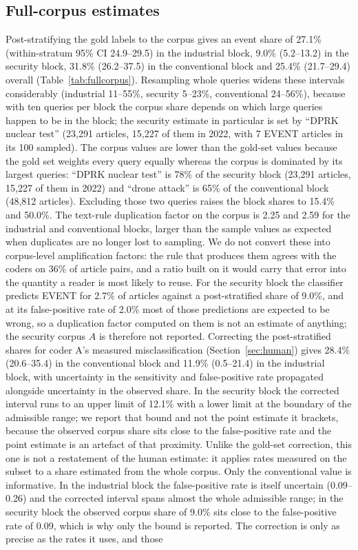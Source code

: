 \documentclass[1p,times]{elsarticle}
\begin{document}
\subsection{Full-corpus estimates}
\label{sec:corpus}
Post-stratifying the gold labels to the corpus gives an event share of 27.1\% (within-stratum 95\% CI 24.9--29.5) in the industrial block, 9.0\% (5.2--13.2) in the security block, 31.8\% (26.2--37.5) in the conventional block and 25.4\% (21.7--29.4) overall (Table~\ref{tab:fullcorpus}). Resampling whole queries widens these intervals considerably (industrial 11--55\%, security 5--23\%, conventional 24--56\%), because with ten queries per block the corpus share depends on which large queries happen to be in the block; the security estimate in particular is set by ``DPRK nuclear test'' (23,291 articles, 15,227 of them in 2022, with 7 EVENT articles in its 100 sampled). The corpus values are lower than the gold-set values because the gold set weights every query equally whereas the corpus is dominated by its largest queries: ``DPRK nuclear test'' is 78\% of the security block (23,291 articles, 15,227 of them in 2022) and ``drone attack'' is 65\% of the conventional block (48,812 articles). Excluding those two queries raises the block shares to 15.4\% and 50.0\%. The text-rule duplication factor on the corpus is 2.25 and 2.59 for the industrial and conventional blocks, larger than the sample values as expected when duplicates are no longer lost to sampling. We do not convert these into corpus-level amplification factors: the rule that produces them agrees with the coders on 36\% of article pairs, and a ratio built on it would carry that error into the quantity a reader is most likely to reuse. For the security block the classifier predicts EVENT for 2.7\% of articles against a post-stratified share of 9.0\%, and at its false-positive rate of 2.0\% most of those predictions are expected to be wrong, so a duplication factor computed on them is not an estimate of anything; the security corpus $A$ is therefore not reported. Correcting the post-stratified shares for coder A's measured misclassification (Section~\ref{sec:human}) gives 28.4\% (20.6--35.4) in the conventional block and 11.9\% (0.5--21.4) in the industrial block, with uncertainty in the sensitivity and false-positive rate propagated alongside uncertainty in the observed share. In the security block the corrected interval runs to an upper limit of 12.1\% with a lower limit at the boundary of the admissible range; we report that bound and not the point estimate it brackets, because the observed corpus share sits close to the false-positive rate and the point estimate is an artefact of that proximity. Unlike the gold-set correction, this one is not a restatement of the human estimate: it applies rates measured on the subset to a share estimated from the whole corpus. Only the conventional value is informative. In the industrial block the false-positive rate is itself uncertain (0.09--0.26) and the corrected interval spans almost the whole admissible range; in the security block the observed corpus share of 9.0\% sits close to the false-positive rate of 0.09, which is why only the bound is reported. The correction is only as precise as the rates it uses, and those 
\end{document}
